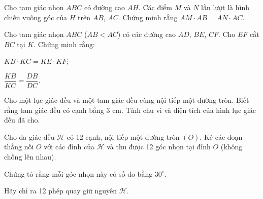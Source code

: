 \begin{practice}
\begin{questions}[resume=SBT]
        \item Cho tam giác nhọn $ABC$ có đường cao $AH$. Các điểm $M$ và $N$ lần lượt là hình chiếu vuông góc của $H$ trên $AB$, $AC$. Chứng minh rằng $AM\cdot AB=AN\cdot AC$.
        \answerline
        \answerline
        \answerline

        \item Cho tam giác nhọn $ABC$ ($AB<AC$) có các đường cao $AD$, $BE$, $CF$. Cho $EF$ cắt $BC$ tại $K$. Chứng minh rằng:
        \begin{questions}
            \item $KB\cdot KC=KE\cdot KF$;
            \item $\dfrac{KB}{KC}=\dfrac{DB}{DC}$.
        \end{questions}
        \answerline
        \answerline
        \answerline
        \answerline

        \item Cho một lục giác đều và một tam giác đều cùng nội tiếp một đường tròn. Biết rằng tam giác đều có cạnh bằng $3$ cm. Tính chu vi và diện tích của hình lục giác đều đã cho.
        \answerline
        \answerline
        \answerline

        \item Cho đa giác đều $\mathcal{H}$ có 12 cạnh, nội tiếp một đường tròn $(O)$. Kẻ các đoạn thẳng nối $O$ với các đỉnh của $\mathcal{H}$ và thu được 12 góc nhọn tại đỉnh $O$ (không chồng lên nhau).
        \begin{questions}
            \item Chứng tỏ rằng mỗi góc nhọn này có số đo bằng $30^\circ$.
            \item Hãy chỉ ra 12 phép quay giữ nguyên $\mathcal{H}$.
        \end{questions}
        \answerline
        \answerline
        \answerline
    \end{questions}
\end{practice}
